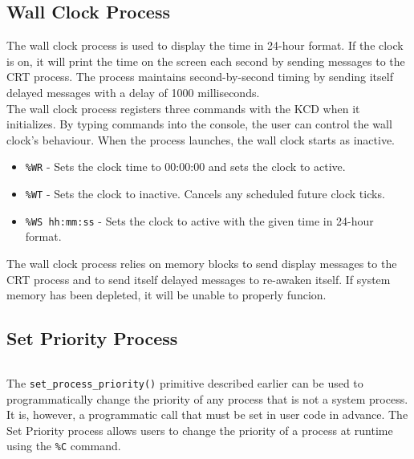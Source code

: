 \documentclass[12pt]{report}
\begin{document}
\subsection{Wall Clock Process}

The wall clock process is used to display the time in 24-hour format. If the clock is on, it will print the time on the screen each second by sending messages to the CRT process. The process maintains second-by-second timing by sending itself delayed messages with a delay of 1000 milliseconds.\\

The wall clock process registers three commands with the KCD when it initializes. By typing commands into the console, the user can control the wall clock's behaviour. When the process launches, the wall clock starts as inactive.

\begin{itemize}

\item {\tt \%WR} - Sets the clock time to 00:00:00 and sets the clock to active.
\item {\tt \%WT} - Sets the clock to inactive. Cancels any scheduled future clock ticks.
\item {\tt \%WS hh:mm:ss} - Sets the clock to active with the given time in 24-hour format.

\end{itemize}

The wall clock process relies on memory blocks to send display messages to the CRT process and to send itself delayed messages to re-awaken itself. If system memory has been depleted, it will be unable to properly funcion.\\

\subsection{Set Priority Process}

\begin{minipage}{\textwidth}
\begin{lstlisting}[language=C, frame=single]
%C process_id new_priority
\end{lstlisting}
\end{minipage}

The {\tt set\_process\_priority()} primitive described earlier can be used to programmatically change the priority of any process that is not a system process. It is, however, a programmatic call that must be set in user code in advance. The Set Priority process allows users to change the priority of a process at runtime using the {\tt \%C} command.\\
\end{document}
